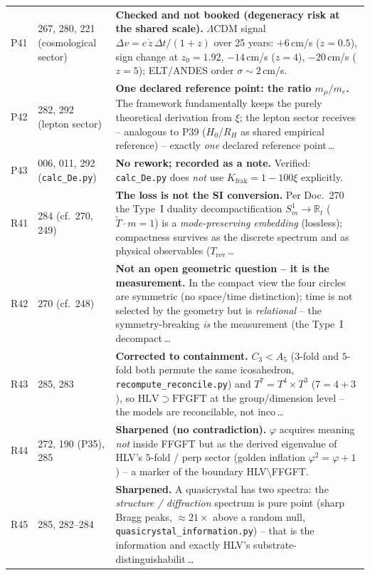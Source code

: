 \begin{longtable}{@{}p{0.9cm}p{3.1cm}p{10.2cm}@{}}
P41 & 267, 280, 221 (cosmological sector) & \textbf{Checked and not booked (degeneracy risk at the shared scale).} $\Lambda$CDM signal $\Delta v=c\,\dot z\,\Delta t/(1+z)$ over 25 years: $+6$\,cm/s ($z{=}0.5$), sign change at $z_0=1.92$, $-14$\,cm/s ($z{=}4$), $-20$\,cm/s ($z{=}5$); ELT/ANDES order $\sigma\sim2$\,cm/s. \\
P42 & 282, 292 (lepton sector) & \textbf{One declared reference point: the ratio $m_\mu/m_e$.} The framework fundamentally keeps the purely theoretical derivation from $\xi$; the lepton sector receives -- analogous to P39 ($H_0$/$R_H$ as shared empirical reference) -- exactly \emph{one} declared reference point\,\ldots \\
P43 & 006, 011, 292 (\texttt{calc\_De.py}) & \textbf{No rework; recorded as a note.} Verified: \texttt{calc\_De.py} does \emph{not} use $K_{\text{frak}}=1-100\xi$ explicitly. \\
R41 & 284 (cf.\ 270, 249) & \textbf{The loss is not the SI conversion.} Per Doc.~270 the Type~I duality decompactification $S^1_m\!\to\!\mathbb{R}_t$ ($\tilde{T}\cdot m=1$) is a \emph{mode-preserving embedding} (lossless); compactness survives as the discrete spectrum and as physical observables ($T_\text{rev}$\,\ldots \\
R42 & 270 (cf.\ 248) & \textbf{Not an open geometric question -- it is the measurement.} In the compact view the four circles are symmetric (no space/time distinction); time is not selected by the geometry but is \emph{relational} -- the symmetry-breaking \emph{is} the measurement (the Type~I decompact\,\ldots \\
R43 & 285, 283 & \textbf{Corrected to containment.} $C_3<A_5$ ($3$-fold and $5$-fold both permute the same icosahedron, \texttt{recompute\_reconcile.py}) and $T^7=T^4\times T^3$ ($7=4+3$), so $\mathrm{HLV}\supset\mathrm{FFGFT}$ at the group/dimension level -- the models are reconcilable, not inco\,\ldots \\
R44 & 272, 190 (P35), 285 & \textbf{Sharpened (no contradiction).} $\varphi$ acquires meaning \emph{not} inside FFGFT but as the derived eigenvalue of HLV's $5$-fold / perp sector (golden inflation $\varphi^2=\varphi+1$) -- a marker of the boundary HLV$\setminus$FFGFT. \\
R45 & 285, 282--284 & \textbf{Sharpened.} A quasicrystal has two spectra: the \emph{structure / diffraction} spectrum is pure point (sharp Bragg peaks, $\approx21\times$ above a random null, \texttt{quasicrystal\_information.py}) -- that is the information and exactly HLV's substrate-distinguishabilit\,\ldots \\

\end{longtable}
